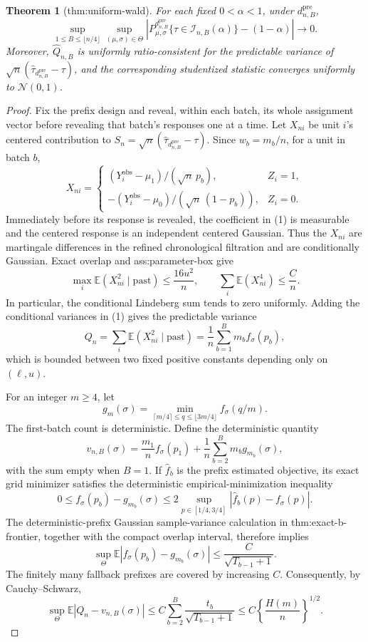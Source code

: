 \documentclass{article}
\newtheorem{theorem}{Theorem}
\begin{document}
\begin{theorem}[thm:uniform-wald]\label{thm:uniform-wald}
For each fixed \(0<\alpha<1\), under \(d^{\mathrm{pre}}_{n,B}\), \[\sup_{1\le B\le\lfloor n/4\rfloor}\sup_{(\mu,\sigma)\in\Theta}\left|P^{d^{\mathrm{pre}}_{n,B}}_{\mu,\sigma}\{\tau\in\mathcal I_{n,B}(\alpha)\}-(1-\alpha)\right|\to0.\] Moreover, \(\widehat Q_{n,B}\) is uniformly ratio-consistent for the predictable variance of \(\sqrt n(\widehat\tau_{d^{\mathrm{pre}}_{n,B}}-\tau)\), and the corresponding studentized statistic converges uniformly to \(\mathcal N(0,1)\).
\end{theorem}
\begin{proof}
Fix the prefix design and reveal, within each batch, its whole assignment vector before revealing that batch's responses one at a time.  Let \(X_{ni}\) be unit \(i\)'s centered contribution to
\(S_n=\sqrt n(\widehat\tau_{d^{\mathrm{pre}}_{n,B}}-\tau)\).  Since \(w_b=m_b/n\), for a unit in batch \(b\),
\[
X_{ni}=\begin{cases}
 (Y_i^{\mathrm{obs}}-\mu_1)/(\sqrt n\,p_b),&Z_i=1,\\
 -(Y_i^{\mathrm{obs}}-\mu_0)/(\sqrt n\,(1-p_b)),&Z_i=0.
\end{cases}                                                   \tag{1}
\]
Immediately before its response is revealed, the coefficient in (1) is measurable and the centered response is an independent centered Gaussian.  Thus the \(X_{ni}\) are martingale differences in the refined chronological filtration and are conditionally Gaussian.  Exact overlap and ass:parameter-box give
\[
\max_i\mathbb E(X_{ni}^2\mid\text{past})\leq\frac{16u^2}{n},
\qquad
\sum_i\mathbb E(X_{ni}^4)\leq\frac{C}{n}.                  \tag{2}
\]
In particular, the conditional Lindeberg sum tends to zero uniformly.  Adding the conditional variances in (1) gives the predictable variance
\[
Q_n=\sum_i\mathbb E(X_{ni}^2\mid\text{past})
=\frac1n\sum_{b=1}^Bm_b f_\sigma(p_b),                     \tag{3}
\]
which is bounded between two fixed positive constants depending only on \((\ell,u)\).

For an integer \(m\geq4\), let
\[
g_m(\sigma)=\min_{\lceil m/4\rceil\leq q\leq\lfloor3m/4\rfloor}
 f_\sigma(q/m).
\]
The first-batch count is deterministic.  Define the deterministic quantity
\[
v_{n,B}(\sigma)=\frac{m_1}{n}f_\sigma(p_1)
 +\frac1n\sum_{b=2}^Bm_bg_{m_b}(\sigma),                    \tag{4}
\]
with the sum empty when \(B=1\).  If \(\widehat f_b\) is the prefix estimated objective, its exact grid minimizer satisfies the deterministic empirical-minimization inequality
\[
0\leq f_\sigma(p_b)-g_{m_b}(\sigma)
\leq2\sup_{p\in[1/4,3/4]}|\widehat f_b(p)-f_\sigma(p)|.
\]
The deterministic-prefix Gaussian sample-variance calculation in thm:exact-b-frontier, together with the compact overlap interval, therefore implies
\[
\sup_{\Theta}\mathbb E|f_\sigma(p_b)-g_{m_b}(\sigma)|
\leq\frac{C}{\sqrt{T_{b-1}+1}}.                             \tag{5}
\]
The finitely many fallback prefixes are covered by increasing \(C\).  Consequently, by Cauchy--Schwarz,
\[
\sup_\Theta\mathbb E|Q_n-v_{n,B}(\sigma)|
\leq C\sum_{b=2}^B\frac{t_b}{\sqrt{T_{b-1}+1}}
\leq C\left\{\frac{H(m)}n\right\}^{1/2}.                  \tag{6}
\]


\end{proof}
\end{document}
